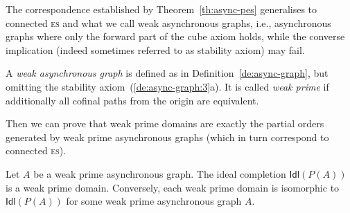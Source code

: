 \documentclass[conference]{IEEEtran}
\newcommand{\ideal}[1]{\ensuremath{\mathsf{Idl}({#1})}}
\newcommand{\esabbr}{\textsc{es}}
\begin{document}
The correspondence established by Theorem~\ref{th:async-pes}
generalises to connected {\esabbr} and what we call weak
asynchronous graphs, i.e., asynchronous graphs where only the forward
part of the cube axiom holds, while the converse implication (indeed
sometimes referred to as stability axiom) may fail.

\begin{definition}
  A \emph{weak asynchronous graph} is defined as in
  Definition~\ref{de:async-graph}, but omitting the stability
  axiom~(\ref{de:async-graph:3}a). It is called \emph{weak prime} if
  additionally all cofinal paths from the origin are equivalent.
\end{definition}

Then we can prove that weak prime domains are exactly the partial
orders generated by weak prime asynchronous graphs (which in turn
correspond to connected {\esabbr}).

\begin{proposition}
  \label{pr:was-ces}
  Let $A$ be a weak prime asynchronous graph. The ideal completion
  $\ideal{P(A)}$ is a weak prime domain. Conversely, each weak
  prime domain is isomorphic to $\ideal{P(A)}$ for some weak prime
  asynchronous graph $A$.
\end{proposition}
\end{document}
